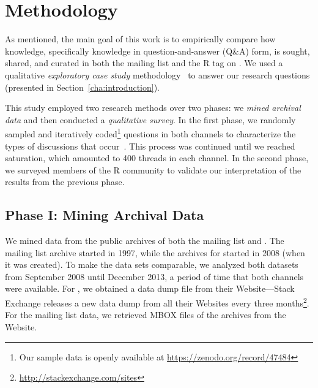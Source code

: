 \section{Methodology}
\label{cha:methodology}

As mentioned, the main goal of this work is to empirically compare how knowledge, specifically knowledge in question-and-answer (Q\&A) form, is sought, shared, and curated in both the \RH mailing list and the R tag on \SO. We used a qualitative \textit{exploratory case study} methodology~\cite{Creswell2009,Runeson2012} to answer our research questions (presented in Section~\ref{cha:introduction}).


This study employed two research methods over two phases: we \textit{mined archival data} and then conducted a \textit{qualitative survey}. In the first phase,
we randomly sampled and iteratively coded\footnote{Our sample data is openly available at \url{https://zenodo.org/record/47484}} questions in both channels to characterize the types of discussions that occur~\cite{carlos_gomez_teshima_2016_47484}. This process was continued until we reached saturation, which amounted to 400 threads in each channel. In the second phase, we surveyed members of the R community to validate our interpretation of the results from the previous phase. %

\subsection{Phase I: Mining Archival Data} 
\label{sec:studyDesign}
We mined data from the public archives of both the \RH mailing list and \SO. The \RH mailing list archive started in 1997, while the archives for \SO started in 2008 (when it was created).
To make the data sets comparable, we analyzed both datasets from September 2008 until December 2013, a period of time that both channels were available.
For \SO, we obtained a data dump file from their Website---Stack Exchange releases a new data dump from all their Websites every three months\footnote{\url{http://stackexchange.com/sites}}. For the \RH mailing list data, we retrieved MBOX files of the archives from the \RH Website.

